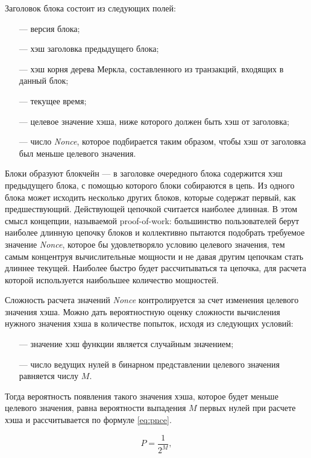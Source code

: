 Заголовок блока состоит из следующих полей:
\begin{itemize}
    \item[---] версия блока;
    \item[---] хэш заголовка предыдущего блока;
    \item[---] хэш корня дерева Меркла, составленного из транзакций, входящих в данный блок;
    \item[---] текущее время;
    \item[---] целевое значение хэша, ниже которого должен быть хэш от заголовка;
    \item[---] число \textit{Nonce}, которое подбирается таким образом, чтобы хэш от заголовка был меньше целевого значения.
\end{itemize}

Блоки образуют блокчейн --- в заголовке очередного блока содержится хэш предыдущего блока, с помощью которого блоки собираются в цепь. Из одного блока может исходить несколько других блоков, которые содержат первый, как предшествующий. Действующей цепочкой считается наиболее длинная. В этом смысл концепции, называемой proof-of-work: большинство пользователей берут наиболее длинную цепочку блоков и коллективно пытаются подобрать требуемое значение \textit{Nonce}, которое бы удовлетворяло условию целевого значения, тем самым концентруя вычислительные мощности и не давая другим цепочкам стать длиннее текущей. Наиболее быстро будет рассчитываться та цепочка, для расчета которой используется наибольшее количество мощностей.

Сложность расчета значений \textit{Nonce} контролируется за счет изменения целевого значения хэша. Можно дать вероятностную оценку сложности вычисления нужного значения хэша в количестве попыток, исходя из следующих условий:
\begin{itemize}
    \item[---] значение хэш функции является случайным значением;
    \item[---] число ведущих нулей в бинарном представлении целевого значения равняется числу $M$.
\end{itemize}

Тогда вероятность появления такого значения хэша, которое будет меньше целевого значения, равна вероятности выпадения $M$ первых нулей при расчете хэша и рассчитывается по формуле \ref{eq:pnce}.

\begin{equation}
    \label{eq:pnce}
    P = \frac{1}{2^M},
\end{equation}

